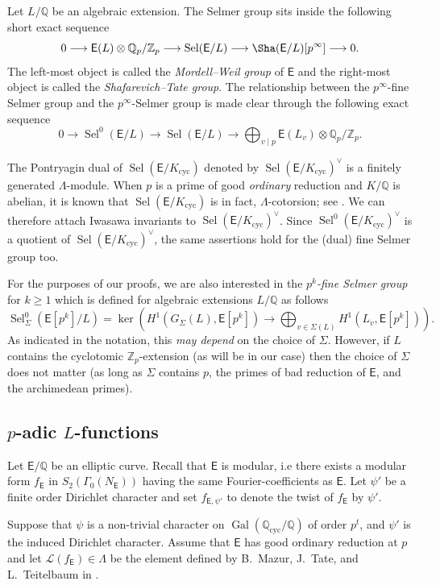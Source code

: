 \documentclass{amsart}
\numberwithin{equation}{section}
\theoremstyle{remark}
\newcommand{\Gal}{\operatorname{Gal}}
\newcommand{\cyc}{\operatorname{cyc}}
\newcommand{\Sel}{\operatorname{Sel}}
\newcommand{\Zp}{\mathbb{Z}_p}
\newcommand{\Qp}{\mathbb{Q}_p}
\newcommand{\Q}{\mathbb{Q}}
\newcommand{\EC}{\mathsf{E}}
\theoremstyle{plain} %
\begin{document}
Let $L/\Q$ be an algebraic extension.
The Selmer group sits inside the following short exact sequence
\[
0 \longrightarrow \EC(L) \otimes \Qp/\Zp \longrightarrow \Sel(\EC/L) \longrightarrow \Sha(\EC/L)[p^\infty] \longrightarrow 0.
\]
The left-most object is called the \emph{Mordell--Weil group} of $\EC$ and the right-most object is called the \emph{Shafarevich--Tate group}.
The relationship between the $p^\infty$-fine Selmer group and the $p^\infty$-Selmer group is made clear through the following exact sequence
\[
0 \longrightarrow \Sel^0(\EC/L) \longrightarrow \Sel(\EC/L) \longrightarrow \bigoplus_{v\mid p} \EC(L_v) \otimes \Qp/\Zp.
\]


The Pontryagin dual of $\Sel(\EC/K_{\cyc})$ denoted by $\Sel(\EC/K_{\cyc})^\vee$ is a finitely generated $\Lambda$-module.
When $p$ is a prime of good \textit{ordinary} reduction and $K/\Q$ is abelian, it is known that $\Sel(\EC/K_{\cyc})$ is in fact, $\Lambda$-cotorsion; see \cite[Theorem~17.4]{Kat04}.
We can therefore attach Iwasawa invariants to $\Sel(\EC/K_{\cyc})^\vee$.
Since $\Sel^0(\EC/K_{\cyc})^\vee$ is a quotient of $\Sel(\EC/K_{\cyc})^\vee$, the same assertions hold for the (dual) fine Selmer group too.

For the purposes of our proofs, we are also interested in the \emph{$p^k$-fine Selmer group} for $k\geq 1$ which is defined for algebraic extensions $L/\Q$ as follows
\[
\Sel^0_{\Sigma}(\EC[p^k]/L) = \ker\left( H^1(G_{\Sigma}(L), \EC[p^k]) \longrightarrow \bigoplus_{v\in \Sigma(L)} H^1(L_v, \EC[p^k]) \right).
\]
As indicated in the notation, this \emph{may depend} on the choice of $\Sigma$.
However, if $L$ contains the cyclotomic $\Zp$-extension (as will be in our case) then the choice of $\Sigma$ does not matter (as long as $\Sigma$ contains $p$, the primes of bad reduction of $\EC$, and the archimedean primes).

\subsection{\texorpdfstring{$p$-adic $L$-functions}{}}
\label{sec: p-adic L function defn}
Let $\EC/\Q$ be an elliptic curve.
Recall that $\EC$ is modular, i.e there exists a modular form $f_{\EC}$ in $S_2(\Gamma_0(N_{\EC}))$ having the same Fourier-coefficients as $\EC$.
Let $\psi'$ be a finite order Dirichlet character and set $f_{\EC,\psi'}$ to denote the twist of $f_{\EC}$ by $\psi'$.

Suppose that $\psi$ is a non-trivial character on $\Gal(\Q_{\cyc}/\Q)$ of order $p^t$, and $\psi'$ is the induced Dirichlet character.
Assume that $\EC$ has good ordinary reduction at $p$ and let $\mathcal{L}(f_{\EC})\in \Lambda$ be the element defined by B.~Mazur, J.~Tate, and L.~Teitelbaum in \cite[Section 13]{MTT}.
\end{document}
